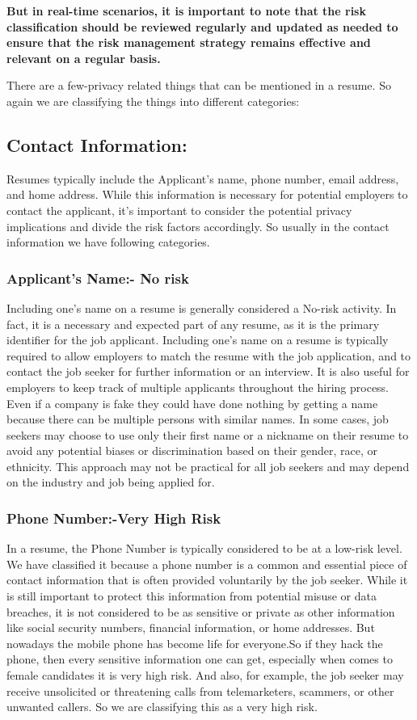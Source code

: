 \documentclass{article}
\begin{document}
\textbf{But in real-time scenarios, it is important to note that the risk classification should be reviewed regularly and updated as needed to ensure that the risk management strategy remains effective and relevant on a regular basis.}

There are a few-privacy related things that can be mentioned in a resume. So again we are classifying the things into different categories:

\subsection{Contact Information:}

Resumes typically include the Applicant's name, phone number, email address, and home address. 
While this information is necessary for potential employers to contact the applicant, it's important to consider the potential privacy implications and divide the risk factors accordingly.
So usually in the contact information we have following categories.

\subsubsection{Applicant’s Name:- No risk
}
Including one's name on a resume is generally considered a No-risk activity. In fact, it is a necessary and expected part of any resume, as it is the primary identifier for the job applicant. Including one's name on a resume is typically required to allow employers to match the resume with the job application, and to contact the job seeker for further information or an interview. It is also useful for employers to keep track of multiple applicants throughout the hiring process.
Even if a company is fake they could have done nothing by getting a name because there can be multiple persons with similar names. In some cases, job seekers may choose to use only their first name or a nickname on their resume to avoid any potential biases or discrimination based on their gender, race, or ethnicity. This approach may not be practical for all job seekers and may depend on the industry and job being applied for.
\subsubsection{Phone Number:-Very High Risk}
In a resume, the Phone Number is typically considered to be at a low-risk level. We have classified it because a phone number is a common and essential piece of contact information that is often provided voluntarily by the job seeker.
While it is still important to protect this information from potential misuse or data breaches, it is not considered to be as sensitive or private as other information like social security numbers, financial information, or home addresses.
But nowadays the mobile phone has become life for everyone.So if they hack the phone, then every sensitive information one can get, especially when comes to female candidates it is very high risk. And also, for example, the job seeker may receive unsolicited or threatening calls from telemarketers, scammers, or other unwanted callers. So we are classifying this as a very high risk.
\end{document}
